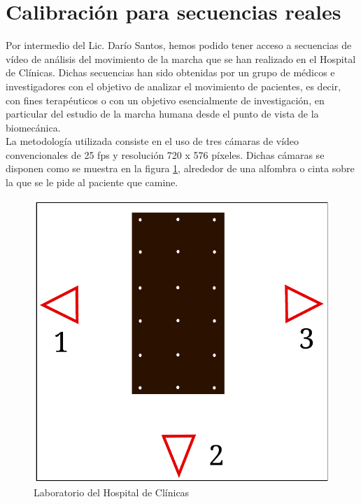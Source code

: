 
\section{Calibración para secuencias reales}

\label{seccion_calibracion_secuencias_reales}


Por intermedio del Lic. Darío Santos, hemos podido tener acceso a secuencias de vídeo de análisis del movimiento de la marcha que se han realizado en el Hospital de Clínicas. Dichas secuencias han sido obtenidas por un grupo de médicos e investigadores con el objetivo de analizar el movimiento de pacientes, es decir, con fines terapéuticos o con un objetivo esencialmente de investigación, en particular del estudio de la marcha humana desde el punto de vista de la biomecánica.\\


La metodología utilizada consiste en el uso de tres cámaras de vídeo convencionales de 25 fps y resolución  720 x 576 píxeles. Dichas cámaras se disponen como se muestra en la figura \ref{fig: lab_real}, alrededor de una alfombra o cinta sobre la que se le pide al paciente que camine.


\begin{figure}[ht!]
\centering
\includegraphics[scale=0.5]{img/calibracion/lab_real.pdf}
\vspace{-0.3cm}
\caption{Laboratorio del Hospital de Clínicas}
\label{fig: lab_real}
\end{figure}


